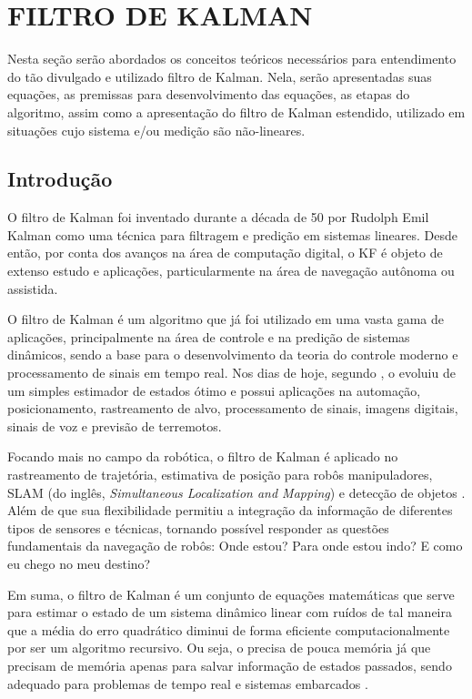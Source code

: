 \documentclass[acronym, symbols, table]{fei}
\begin{document}
	\section{FILTRO DE KALMAN}
		
		Nesta seção serão abordados os conceitos teóricos necessários para entendimento do tão divulgado e utilizado filtro de Kalman. Nela, serão apresentadas suas equações, as premissas para desenvolvimento das equações, as etapas do algoritmo, assim como a apresentação do filtro de Kalman estendido, utilizado em situações cujo sistema e/ou medição são não-lineares.
		
		\subsection{Introdução}
		
			O filtro de Kalman foi inventado durante a década de 50 por Rudolph Emil Kalman como uma técnica para filtragem e predição em sistemas lineares. Desde então, por conta dos avanços na área de computação digital, o KF é objeto de extenso estudo e aplicações, particularmente na área de navegação autônoma ou assistida.
			
			O filtro de Kalman é um algoritmo que já foi utilizado em uma vasta gama de aplicações, principalmente na área de controle e na predição de sistemas dinâmicos, sendo a base para o desenvolvimento da teoria do controle moderno e processamento de sinais em tempo real. Nos dias de hoje, segundo \textcite{khodarahmi2023review}, o  evoluiu de um simples estimador de estados ótimo e possui aplicações na automação, posicionamento, rastreamento de alvo, processamento de sinais, imagens digitais, sinais de voz e previsão de terremotos.
			
			Focando mais no campo da robótica, o filtro de Kalman é aplicado no rastreamento de trajetória, estimativa de posição para robôs manipuladores, SLAM (do inglês, \textit{Simultaneous Localization and Mapping}) e detecção de objetos \cite{urrea2021kalman}. Além de que sua flexibilidade permitiu a integração da informação de diferentes tipos de sensores e técnicas, tornando possível responder as questões fundamentais da navegação de robôs: Onde estou? Para onde estou indo? E como eu chego no meu destino?
			
			Em suma, o filtro de Kalman é um conjunto de equações matemáticas que serve para estimar o estado de um sistema dinâmico linear com ruídos de tal maneira que a média do erro quadrático diminui de forma eficiente computacionalmente por ser um algoritmo recursivo. Ou seja, o  precisa de pouca memória já que precisam de memória apenas para salvar informação de estados passados, sendo adequado para problemas de tempo real e sistemas embarcados \cite{khodarahmi2023review}.
			
\end{document}
